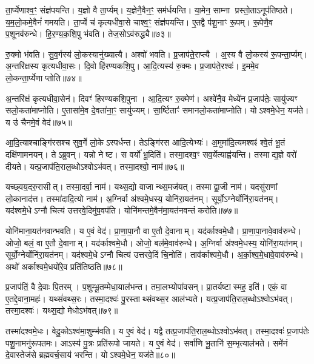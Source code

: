 ता॒र्प्येणाश्व॒ꣳ॒ संज्ञ॑पयन्ति।
य॒ज्ञो वै ता॒र्प्यम्।
य॒ज्ञेनै॒वैन॒ꣳ॒ सम॑र्धयन्ति।
या॒मेन॒ साम्ना प्रस्तो॒ता\-ऽनूप॑तिष्ठते।
य॒म॒लो॒कमे॒वैनं॑ गमयति।
ता॒र्प्ये च॑ कृत्यधीवा॒से चाश्व॒ꣳ॒ संज्ञ॑पयन्ति।
ए॒तद्वै प॑शू॒नाꣳ रू॒पम्।
रू॒पेणै॒व प॒शूनव॑रुन्धे।
हि॒र॒ण्य॒क॒शि॒पु भ॑वति।
तेज॒सो\-ऽव॑रुद्ध्यै॥७३॥

रु॒क्मो भ॑वति।
सु॒व॒र्गस्य॑ लो॒कस्यानु॑ख्यात्यै।
अश्वो॑ भवति।
प्र॒जाप॑ते॒राप्त्यै।
अ॒स्य वै लो॒कस्य॑ रू॒पन्ता॒र्प्यम्।
अ॒न्तरि॑क्षस्य कृत्यधीवा॒सः।
दि॒वो हि॑रण्यकशि॒पु।
आ॒दि॒त्यस्य॑ रु॒क्मः।
प्र॒जाप॑ते॒रश्वः॑।
इ॒ममे॒व लो॒कन्ता॒र्प्येणाप्तोति॥७४॥

अ॒न्तरि॑क्षं कृत्यधीवा॒सेन॑।
दिवꣳ॑ हिरण्यकशि॒पुना।
आ॒दि॒त्यꣳ रु॒क्मेण॑।
अश्वे॑नै॒व मेध्ये॑न प्र॒जाप॑तेः॒ सायु॑ज्यꣳ सलो॒कता॑माप्नोति।
ए॒तासा॑मे॒व दे॒वता॑ना॒ꣳ॒ सायु॑ज्यम्।
सा॒र्ष्टिताꣳ॑ समानलो॒कता॑माप्नोति।
योऽश्वमे॒धेन॒ यज॑ते।
य उ॑ चैनमे॒वं वेद॑॥७५॥\anuvakamend[अव॑रुध्या आप्नोत्य॒ष्टौ च॑]

आ॒दि॒त्याश्चाङ्गि॑रसश्च सुव॒र्गे लो॒के\-ऽस्पर्धन्त।
तेऽङ्गि॑रस आदि॒त्येभ्यः॑।
अ॒मुमा॑दि॒त्यमश्वꣴ॑ श्वे॒तं भू॒तं दक्षि॑णामनयन्।
तेऽब्रुवन्।
यन्नो नेष्ट।
स वर्यो॑ भू॒दिति॑।
तस्मा॒दश्व॒ꣳ सव॒र्येत्याह्व॑यन्ति।
तस्माद्य॒ज्ञे वरो॑ दीयते।
यत्प्र॒जाप॑ति॒रा\-ल॒ब्धो\-ऽश्वो\-ऽभ॑वत्।
तस्मा॒दश्वो॒ नाम॑॥७६॥

यच्छ्वय॒दरु॒रासीत्।
तस्मा॒दर्वा॒ नाम॑।
यथ्स॒द्यो वाजान्थ्स॒म\-ज॑यत्।
तस्माद्वा॒जी नाम॑।
यदसु॑राणां लो॒कानाद॑त्त।
तस्मा॑दादि॒त्यो नाम॑।
अ॒ग्निर्वा अ॑श्वमे॒धस्य॒ योनि॑रा॒\-यत॑नम्।
सूर्यो॒\-ऽग्नेर्योनि॑रा॒\-यत॑नम्।
यद॑श्वमे॒धे\-ऽग्नौ चित्य॑ उत्तरवे॒दिमु॑प॒वप॑ति।
योनि॑मन्तमे॒वैन॑मा॒यत॑नवन्तं करोति॥७७॥

योनि॑माना॒यत॑नवान्भवति।
य ए॒वं वेद॑।
प्रा॒णा॒पा॒नौ वा ए॒तौ दे॒वानाम्।
यद॑र्काश्वमे॒धौ।
प्रा॒णा॒पा॒नावे॒वाव॑रुन्धे।
ओजो॒ बलं॒ वा ए॒तौ दे॒वानाम्।
यद॑र्काश्वमे॒धौ।
ओजो॒ बल॑मे॒वाव॑रुन्धे।
अ॒ग्निर्वा अ॑श्वमे॒धस्य॒ योनि॑रा॒यत॑नम्।
सूर्यो॒ग्नेर्योनि॑रा॒यत॑नम्।
यद॑श्वमे॒धे\-ऽग्नौ चित्य॑ उत्तरवे॒दिं चि॒नोति॑।
ताव॑र्काश्वमे॒धौ।
अ॒र्का॒श्व॒मे॒धावे॒वाव॑रुन्धे।
अथो॑ अर्काश्वमे॒धयो॑रे॒व प्रति॑तिष्ठति॥७८॥\anuvakamend[नाम॑ करोति॒ सूर्यो॒\-ऽग्नेर्योनि॑रा॒यत॑नञ्च॒त्वारि॑ च]

प्र॒जाप॑तिं॒ वै दे॒वाः पि॒तरम्।
प॒शुम्भू॒तम्मेधा॒याल॑भन्त।
तमा॒लभ्योपा॑वसन्।
प्रा॒तर्यष्टास्मह॒ इति॑।
एकं॒ वा ए॒तद्दे॒वाना॒महः॑।
यथ्सं॑वथ्स॒रः।
तस्मा॒दश्वः॑ पु॒रस्ताथ्संवथ्स॒र आल॑भ्यते।
यत्प्र॒जाप॑ति॒राल॒ब्धो\-ऽश्वो\-ऽभ॑वत्।
तस्मा॒दश्वः॑।
यथ्स॒द्यो मेधो\-ऽभ॑वत्॥७९॥

तस्मा॑दश्वमे॒धः।
वेदु॒को\-ऽश्व॑मा॒शुम्भ॑वति।
य ए॒वं वेद॑।
यद्वै तत्प्र॒जाप॑ति॒राल॒ब्धो\-ऽश्वो\-ऽभ॑वत्।
तस्मा॒दश्वः॑ प्र॒जाप॑तेः पशू॒नामनु॑रूपतमः।
आऽस्य॑ पु॒त्रः प्रति॑रूपो जायते।
य ए॒वं वेद॑।
सर्वा॑णि भू॒तानि॑ स॒म्भृत्याल॑भते।
समे॑नं दे॒वास्तेज॑से ब्रह्मवर्च॒साय॑ भरन्ति।
योऽश्वमे॒धेन॒ यज॑ते॥८०॥

